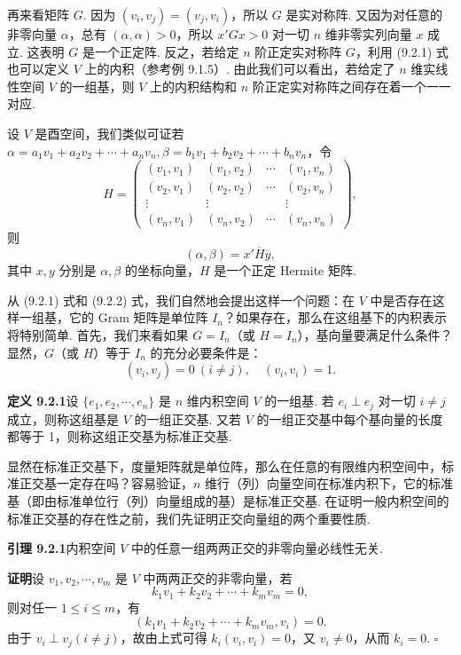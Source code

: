 \documentclass[UTF8, 12pt, fontset=fandol, oneside]{ctexart}
\begin{document}
再来看矩阵 $G$. 因为 $(v_i,v_j)=(v_j,v_i)$，所以 $G$ 是实对称阵. 又因为对任意的非零向量 $\alpha$，总有 $(\alpha,\alpha)>0$，所以 $x'Gx>0$ 对一切 $n$ 维非零实列向量 $x$ 成立. 这表明 $G$ 是一个正定阵. 反之，若给定 $n$ 阶正定实对称阵 $G$，利用 (9.2.1) 式也可以定义 $V$ 上的内积（参考例 9.1.5）. 由此我们可以看出，若给定了 $n$ 维实线性空间 $V$ 的一组基，则 $V$ 上的内积结构和 $n$ 阶正定实对称阵之间存在着一个一一对应.

设 $V$ 是酉空间，我们类似可证若 $\alpha=a_1v_1+a_2v_2+\cdots+a_nv_n,\beta=b_1v_1+b_2v_2+\cdots+b_nv_n$，令
\[
  H=
  \left(\begin{array}{cccc}
    (v_1,v_1) & (v_1,v_2) & \cdots & (v_1,v_n)\\
    (v_2,v_1) & (v_2,v_2) & \cdots & (v_2,v_n)\\
    \vdots & \vdots & & \vdots\\
    (v_n,v_1) & (v_n,v_2) & \cdots & (v_n,v_n)
  \end{array}\right),
\]
则
\begin{equation}
  (\alpha,\beta)=x'\overline H\overline y,
  \tag{9.2.2}
\end{equation}
其中 $x,y$ 分别是 $\alpha,\beta$ 的坐标向量，$H$ 是一个正定 Hermite 矩阵.

从 (9.2.1) 式和 (9.2.2) 式，我们自然地会提出这样一个问题：在 $V$ 中是否存在这样一组基，它的 Gram 矩阵是单位阵 $I_n$？如果存在，那么在这组基下的内积表示将特别简单. 首先，我们来看如果 $G=I_n$（或 $H=I_n$），基向量要满足什么条件？显然，$G$（或 $H$）等于 $I_n$ 的充分必要条件是：
\[
  (v_i,v_j)=0\ (i\ne j),\quad (v_i,v_i)=1.
\]

\noindent\textbf{定义 9.2.1}\quad 设 $\{e_1,e_2,\cdots,e_n\}$ 是 $n$ 维内积空间 $V$ 的一组基. 若 $e_i\perp e_j$ 对一切 $i\ne j$ 成立，则称这组基是 $V$ 的一组正交基. 又若 $V$ 的一组正交基中每个基向量的长度都等于 1，则称这组正交基为标准正交基.

显然在标准正交基下，度量矩阵就是单位阵，那么在任意的有限维内积空间中，标准正交基一定存在吗？容易验证，$n$ 维行（列）向量空间在标准内积下，它的标准基（即由标准单位行（列）向量组成的基）是标准正交基. 在证明一般内积空间的标准正交基的存在性之前，我们先证明正交向量组的两个重要性质.

\noindent\textbf{引理 9.2.1}\quad 内积空间 $V$ 中的任意一组两两正交的非零向量必线性无关.

\noindent\textbf{证明}\quad 设 $v_1,v_2,\cdots,v_m$ 是 $V$ 中两两正交的非零向量，若
\[
  k_1v_1+k_2v_2+\cdots+k_mv_m=0,
\]
则对任一 $1\le i\le m$，有
\[
  (k_1v_1+k_2v_2+\cdots+k_mv_m,v_i)=0.
\]
由于 $v_i\perp v_j(i\ne j)$，故由上式可得 $k_i(v_i,v_i)=0$，又 $v_i\ne0$，从而 $k_i=0$. $\square$
\end{document}
